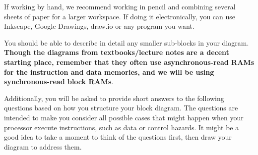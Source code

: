 \documentclass[11pt]{article}
\begin{document}
If working by hand, we recommend working in pencil and combining several sheets of paper for a larger workspace.
If doing it electronically, you can use Inkscape, Google Drawings, draw.io or any program you want.

You should be able to describe in detail any smaller sub-blocks in your diagram.
\textbf{Though the diagrams from textbooks/lecture notes are a decent starting place, remember that they often use asynchronous-read RAMs for the instruction and data memories, and we will be using synchronous-read block RAMs}.

Additionally, you will be asked to provide short answers to the following questions based on how you structure your block diagram. The questions are intended to make you consider all possible cases that might happen when your processor execute instructions, such as data or control hazards. It might be a good idea to take a moment to think of the questions first, then draw your diagram to address them.
\end{document}
